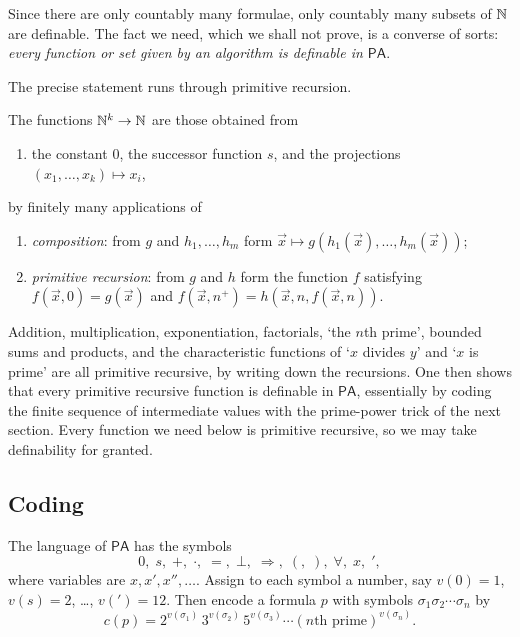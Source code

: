 \documentclass[a4paper]{scrartcl}
\newcommand{\PA}{\mathsf{PA}}
\begin{document}
Since there are only countably many formulae, only countably many subsets of $\mathbb{N}$ are definable. The fact we need, which we shall not prove, is a converse of sorts: \emph{every function or set given by an algorithm is definable in $\PA$}.

The precise statement runs through primitive recursion.

\begin{definition}
  The  functions $\mathbb{N}^k \to \mathbb{N}$ are those obtained from
  \begin{enumerate}[label=(\roman*)]
    \item the constant $0$, the successor function $s$, and the projections $(x_1, \dots, x_k) \mapsto x_i$,
  \end{enumerate}
  by finitely many applications of
  \begin{enumerate}[label=(\roman*), start=2]
    \item \emph{composition}: from $g$ and $h_1, \dots, h_m$ form $\vec x \mapsto g(h_1(\vec x), \dots, h_m(\vec x))$;
    \item \emph{primitive recursion}: from $g$ and $h$ form the function $f$ satisfying $f(\vec x, 0) = g(\vec x)$ and $f(\vec x, n^+) = h(\vec x, n, f(\vec x, n))$.
  \end{enumerate}
\end{definition}

Addition, multiplication, exponentiation, factorials, `the $n$th prime', bounded sums and products, and the characteristic functions of `$x$ divides $y$' and `$x$ is prime' are all primitive recursive, by writing down the recursions. One then shows that every primitive recursive function is definable in $\PA$, essentially by coding the finite sequence of intermediate values with the prime-power trick of the next section. Every function we need below is primitive recursive, so we may take definability for granted.

\subsection{Coding}

The language of $\PA$ has the symbols
$$0, \; s, \; +, \; \cdot, \; =, \; \bot, \; \Rightarrow, \; (, \; ), \; \forall, \; x, \; {}',$$
where variables are $x, x', x'', \dots$. Assign to each symbol a number, say $v(0) = 1$, $v(s) = 2$, \dots, $v(') = 12$. Then encode a formula $p$ with symbols $\sigma_1 \sigma_2 \cdots \sigma_n$ by
$$c(p) = 2^{v(\sigma_1)} \, 3^{v(\sigma_2)} \, 5^{v(\sigma_3)} \cdots (n\text{th prime})^{v(\sigma_n)}.$$
\end{document}
